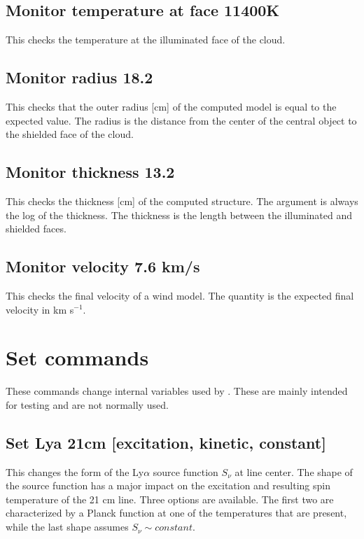 \subsection{Monitor temperature at face 11400K}

This checks the temperature at the illuminated face of the cloud.

\subsection{Monitor radius 18.2}

This checks that the outer radius [cm] of the computed model is equal
to the expected value.
The radius is the distance from the center of the
central object to the shielded face of the cloud.

\subsection{Monitor thickness 13.2}

This checks the thickness [cm] of the computed structure.
The argument
is always the log of the thickness.
The thickness is the length between
the illuminated and shielded faces.

\subsection{Monitor velocity 7.6 km/s}

This checks the final velocity of a wind model.
The quantity is the
expected final velocity in km s$^{-1}$.

\section{Set commands}

These commands change internal variables used by \Cloudy.
These are mainly
intended for testing and are not normally used.

\subsection{Set Lya 21cm [excitation, kinetic, constant]}
This changes the form of the Ly$\alpha$ source function $S_{\nu}$ at line center.
The shape of the source function has a major impact on the excitation
and resulting spin temperature of the 21 cm line.
Three options are available.  The first two are characterized by a Planck function
at one of the temperatures that are present, while the last shape assumes $S_{\nu} \sim constant$.

